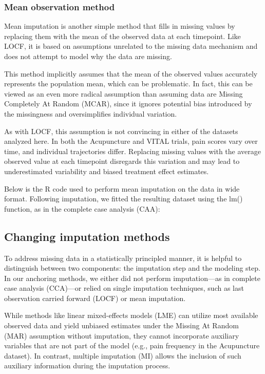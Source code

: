 \documentclass{article}
\begin{document}
\subsubsection{Mean observation method}\label{mean-observation-method}

Mean imputation is another simple method that fills in missing values by
replacing them with the mean of the observed data at each timepoint.
Like LOCF, it is based on assumptions unrelated to the missing data
mechanism and does not attempt to model why the data are missing.

This method implicitly assumes that the mean of the observed values
accurately represents the population mean, which can be problematic. In
fact, this can be viewed as an even more radical assumption than
assuming data are Missing Completely At Random (MCAR), since it ignores
potential bias introduced by the missingness and oversimplifies
individual variation.

As with LOCF, this assumption is not convincing in either of the
datasets analyzed here. In both the Acupuncture and VITAL trials, pain
scores vary over time, and individual trajectories differ. Replacing
missing values with the average observed value at each timepoint
disregards this variation and may lead to underestimated variability and
biased treatment effect estimates.

Below is the R code used to perform mean imputation on the data in wide
format. Following imputation, we fitted the resulting dataset using the
lm() function, as in the complete case analysis (CAA):

\subsection{Changing imputation
methods}\label{changing-imputation-methods}

To address missing data in a statistically principled manner, it is
helpful to distinguish between two components: the imputation step and
the modeling step. In our anchoring methods, we either did not perform
imputation---as in complete case analysis (CCA)---or relied on single
imputation techniques, such as last observation carried forward (LOCF)
or mean imputation.

While methods like linear mixed-effects models (LME) can utilize most
available observed data and yield unbiased estimates under the Missing
At Random (MAR) assumption without imputation, they cannot incorporate
auxiliary variables that are not part of the model (e.g., pain frequency
in the Acupuncture dataset). In contrast, multiple imputation (MI)
allows the inclusion of such auxiliary information during the imputation
process.
\end{document}
